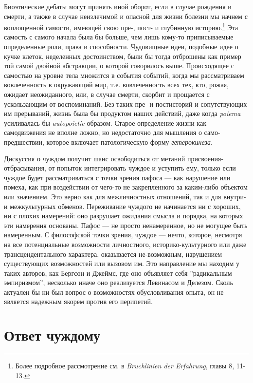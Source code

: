 \documentclass[12pt]{book}
\begin{document}
Биоэтические дебаты могут принять иной оборот, если в случае рождения и смерти, а также в случае неизлечимой и опасной для жизни болезни мы начнем с воплощенной самости, имеющей свою пре-, пост- и глубинную историю.\footnote{Более подробное рассмотрение см. в \textit{Bruchlinien der Erfahrung}, главы 8, 11-13.} Эта самость с самого начала была бы больше, чем лишь кому-то приписываемые определенные роли, права и способности. Чудовищные идеи, подобные идее о кучке клеток, неделенных достоинством, были бы тогда отброшены как пример той самой двойной абстракции, о которой говорилось выше. Происходящее с самостью на уровне тела множится в события событий, когда мы рассматриваем вовлеченность в окружающий мир, т.е. вовлеченность всех тех, кто, рожая, ожидает неожиданного, или, в случае смерти, скорбит и прощается с ускользающим от воспоминаний. Без таких пре- и постисторий и сопутствующих им прерываний, жизнь была бы продуктом наших действий, даже когда \textit{poiema} усиливалась бы \textit{autopoietic} образом. Старое определение жизни как самодвижения не вполне ложно, но недостаточно для мышления о само-предшествии, которое включает патологическую форму \textit{гетерокинеза}.

Дискуссия о чуждом получит шанс освободиться от метаний присвоения-отбрасывания, от попыток интегрировать чуждое и уступить ему, только если чуждое будет рассматриваться с точки зрения пафоса --- как нарушение или помеха, как при воздействии от чего-то не закрепленного за каким-либо объектом или значением. Это верно как для межличностных отношений, так и для внутри- и межкультурных обменов. Переживание чуждого не начинается ни с хороших, ни с плохих намерений: оно разрушает ожидания смысла и порядка, на которых эти намерения основаны. Пафос --- не просто ненамеренное, но не могущее быть намеренным. С философской точки зрения, чуждое --- нечто, которое, несмотря на все потенциальные возможности личностного, историко-культурного или даже трансцендентального характера, оказывается не-возможным, нарушением существующих возможностей или вызовом им. Это направление мы находим у таких авторов, как Бергсон и Джеймс, где оно объявляет себя ''радикальным эмпиризмом'', несколько иначе оно реализуется Левинасом и Делезом. Сколь актуален бы ни был вопрос о возможностях обусловливания опыта, он не является надежным якорем против его перипетий.

\chapter{Ответ чуждому}
\end{document}
